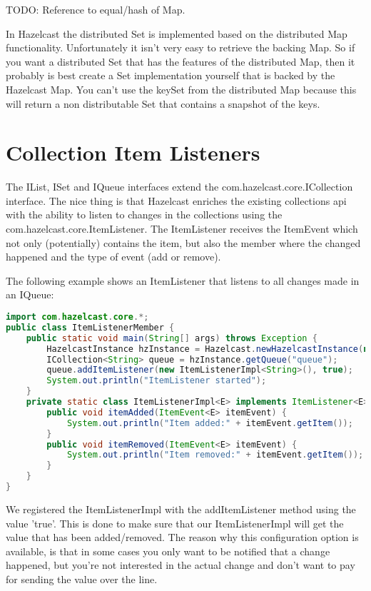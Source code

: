 TODO: Reference to equal/hash of Map.

In Hazelcast the distributed Set is implemented based on the distributed Map functionality. Unfortunately it isn't very easy to retrieve the backing Map. So if you want a distributed Set that has the features of the distributed Map, then it probably is best create a Set implementation yourself that is backed by the Hazelcast Map. You can't use the keySet from the distributed Map because this will return a non distributable Set that contains a snapshot of the keys.

\section{Collection Item Listeners}
The IList, ISet and IQueue interfaces extend the com.hazelcast.core.ICollection interface. The nice thing is that Hazelcast enriches the existing collections api with the ability to listen to changes in the collections using the com.hazelcast.core.ItemListener. The ItemListener receives the ItemEvent which not only (potentially) contains the item, but also the member where the changed happened and the type of event (add or remove).

The following example shows an ItemListener that listens to all changes made in an IQueue:
\begin{lstlisting}[language=java]
import com.hazelcast.core.*;
public class ItemListenerMember {
    public static void main(String[] args) throws Exception {
        HazelcastInstance hzInstance = Hazelcast.newHazelcastInstance(null);
        ICollection<String> queue = hzInstance.getQueue("queue");
        queue.addItemListener(new ItemListenerImpl<String>(), true);
        System.out.println("ItemListener started");
    }
    private static class ItemListenerImpl<E> implements ItemListener<E> {
        public void itemAdded(ItemEvent<E> itemEvent) {
            System.out.println("Item added:" + itemEvent.getItem());
        }
        public void itemRemoved(ItemEvent<E> itemEvent) {
            System.out.println("Item removed:" + itemEvent.getItem());
        }
    }
}
\end{lstlisting}
We registered the ItemListenerImpl with the addItemListener method using the value 'true'. This is done to make sure that our ItemListenerImpl will get the value that has been added/removed. The reason why this configuration option is available, is that in some cases you only want to be notified that a change happened, but you're not interested in the actual change and don't want to pay for sending the value over the line.

